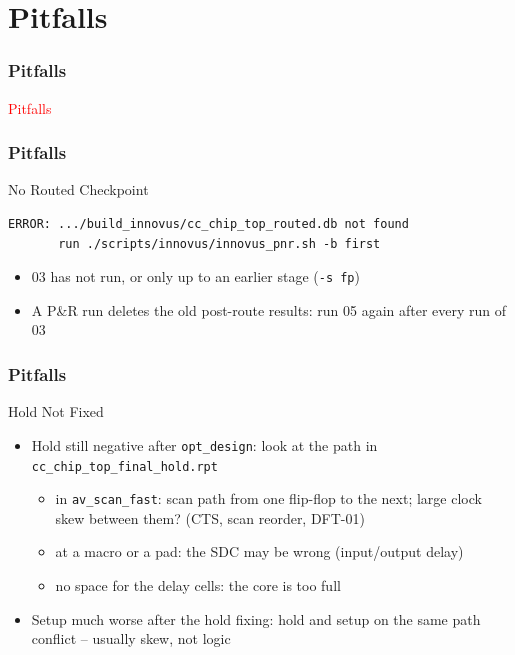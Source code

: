 \documentclass{beamer}
\newcommand{\astitle}{nix}
\newcommand{\assubtitle}{nix}
\newcommand{\cmd}[1]{\texttt{#1}}
\begin{document}
\section{Pitfalls}
\renewcommand{\astitle}{Pitfalls}
\begin{frame}
\frametitle{\astitle}
\textcolor{red}{Pitfalls}
\end{frame}

\renewcommand{\assubtitle}{No Routed Checkpoint}
\begin{frame}[fragile]
\frametitle{\astitle}
\begin{block}{\assubtitle}
\begin{lstlisting}
ERROR: .../build_innovus/cc_chip_top_routed.db not found
       run ./scripts/innovus/innovus_pnr.sh -b first
\end{lstlisting}
  \begin{itemize}
    \item 03 has not run, or only up to an earlier stage (\cmd{-s fp})
    \item A P\&R run deletes the old post-route results: run 05 again
      after every run of 03
  \end{itemize}
\end{block}
\end{frame}

\renewcommand{\assubtitle}{Hold Not Fixed}
\begin{frame}
\frametitle{\astitle}
\begin{block}{\assubtitle}
  \begin{itemize}
    \item Hold still negative after \cmd{opt\_design}: look at the path in
      \cmd{cc\_chip\_top\_final\_hold.rpt}
    \begin{itemize}
      \item in \cmd{av\_scan\_fast}: scan path from one flip-flop to the
        next; large clock skew between them? (CTS, scan reorder, DFT-01)
      \item at a macro or a pad: the SDC may be wrong (input/output delay)
      \item no space for the delay cells: the core is too full
    \end{itemize}
    \item Setup much worse after the hold fixing: hold and setup on the
      same path conflict -- usually skew, not logic
  \end{itemize}
\end{block}
\end{frame}
\end{document}
